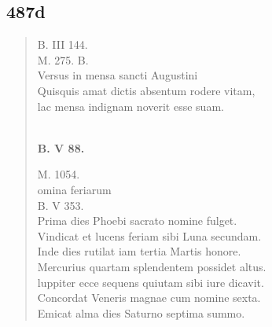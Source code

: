 \documentclass[11pt, a4paper]{report}
\begin{document}
            \subsection*{487d}
      \begin{verse}
      B. III 144. \\ M. 275. B. \\ Versus in mensa sancti Augustini \\ Quisquis amat dictis absentum rodere vitam, \\ lac mensa indignam noverit esse suam. \\ 
        ﻿\pagebreak 
        ﻿\pagebreak 
     \marginpar{[488]} \begin{center} \textbf{B. V 88.} \end{center}M. 1054. \\ omina feriarum \\ B. V 353. \\ Prima dies Phoebi sacrato nomine fulget. \\ Vindicat et lucens feriam sibi Luna secundam. \\ Inde dies rutilat iam tertia Martis honore. \\ Mercurius quartam splendentem possidet altus. \\ luppiter ecce sequens quiutam sibi iure dicavit. \\ Concordat Veneris magnae cum nomine sexta. \\ Emicat alma dies Saturno septima summo. \\ 
      \end{verse}
  
\end{document}
